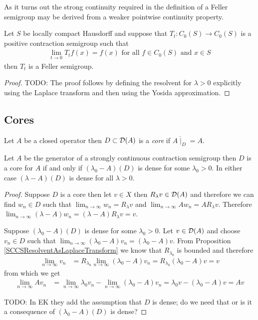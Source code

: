 As it turns out the strong continuity required in the definition of a Feller semigroup may be derived from a weaker pointwise continuity property.  
\begin{prop}Let $S$ be locally compact Hausdorff and suppose that $T_t : C_0(S) \to C_0(S)$ is a positive contraction semigroup such that
\begin{align*}
\lim_{t \to 0} T_tf (x) = f(x) \text{ for all $f \in C_0(S)$ and $x \in S$}
\end{align*}
then $T_t$ is a Feller semigroup.
\end{prop}
\begin{proof}
TODO: The proof follows by defining the resolvent for $\lambda > 0$ explicitly using the Laplace transform and then using the Yosida approximation.  
\end{proof}

\subsection{Cores}
\begin{defn}Let $A$ be a closed operator then $D \subset \mathcal{D}(A)$ is a \emph{core} if $\overline{A \mid_D} = A$.  
\end{defn}

\begin{prop}\label{SCCSCoreViaDenseRange}Let $A$ be the generator of a strongly continuous contraction semigroup then $D$ is a core for $A$ if and only if $(\lambda_0 -A)(D)$ is dense for some $\lambda_0 > 0$.  In either case $(\lambda -A)(D)$ is dense for all $\lambda > 0$.
\end{prop}
\begin{proof}
Suppose $D$ is a core then let $v \in X$ then $R_\lambda v \in \mathcal{D}(A)$ and therefore we can find $w_n \in D$ such that $\lim_{n \to \infty} w_n = R_\lambda v$ and $\lim_{n \to \infty} A w_n = A R_\lambda v$.  Therefore $\lim_{n \to \infty} (\lambda - A) w_n = (\lambda - A) R_\lambda v = v$.  

Suppose $(\lambda_0 -A)(D)$ is dense for some $\lambda_0 > 0$.  Let $v \in \mathcal{D}(A)$ and choose $v_n \in D$ such that $\lim_{n \to \infty} (\lambda_0 - A) v_n = (\lambda_0 - A) v$.  From Proposition \ref{SCCSResolventAsLaplaceTransform} we know that $R_{\lambda_0}$ is bounded and therefore 
\begin{align*}
\lim_{n \to \infty} v_n &= R_{\lambda_0} \lim_{n \to \infty} (\lambda_0 - A) v_n = R_{\lambda_0}  (\lambda_0 - A) v = v
\end{align*}
from which we get 
\begin{align*}
\lim_{n \to \infty} A v_n &= \lim_{n \to \infty} \lambda_0 v_n - \lim_{n \to \infty} (\lambda_0 - A) v_n = \lambda_0 v - (\lambda_0 - A) v = Av
\end{align*}

TODO: In EK they add the assumption that $D$ is dense; do we need that or is it a consequence of $(\lambda_0 -A)(D)$ is dense?
\end{proof}

